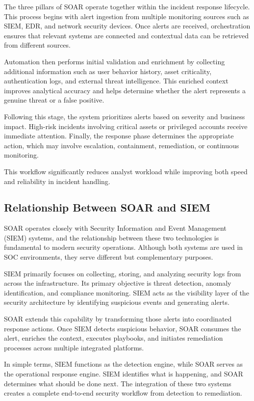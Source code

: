 \documentclass[12pt]{report}
\begin{document}
The three pillars of SOAR operate together within the incident response lifecycle. This process begins with alert ingestion from multiple monitoring sources such as SIEM, EDR, and network security devices. Once alerts are received, orchestration ensures that relevant systems are connected and contextual data can be retrieved from different sources.

Automation then performs initial validation and enrichment by collecting additional information such as user behavior history, asset criticality, authentication logs, and external threat intelligence. This enriched context improves analytical accuracy and helps determine whether the alert represents a genuine threat or a false positive.

Following this stage, the system prioritizes alerts based on severity and business impact. High-risk incidents involving critical assets or privileged accounts receive immediate attention. Finally, the response phase determines the appropriate action, which may involve escalation, containment, remediation, or continuous monitoring.

This workflow significantly reduces analyst workload while improving both speed and reliability in incident handling.

\subsection{Relationship Between SOAR and SIEM}

SOAR operates closely with Security Information and Event Management (SIEM) systems, and the relationship between these two technologies is fundamental to modern security operations. Although both systems are used in SOC environments, they serve different but complementary purposes.

SIEM primarily focuses on collecting, storing, and analyzing security logs from across the infrastructure. Its primary objective is threat detection, anomaly identification, and compliance monitoring. SIEM acts as the visibility layer of the security architecture by identifying suspicious events and generating alerts.

SOAR extends this capability by transforming those alerts into coordinated response actions. Once SIEM detects suspicious behavior, SOAR consumes the alert, enriches the context, executes playbooks, and initiates remediation processes across multiple integrated platforms.

In simple terms, SIEM functions as the detection engine, while SOAR serves as the operational response engine. SIEM identifies what is happening, and SOAR determines what should be done next. The integration of these two systems creates a complete end-to-end security workflow from detection to remediation.
\end{document}

